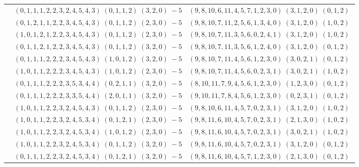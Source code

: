 \documentclass[11pt]{article}
\begin{document}
\begin{longtable}[l]{|c|c|c|}
 \cline{2-3} 
 & $(0 ,1 ,1 ,1 ,2 ,2 ,3 ,2 ,4 ,5 ,4 ,3) \;(0 ,1 ,1 ,2) \;(3 ,2 ,0) \;-5$ & $(9 ,8 ,10 ,6 ,11 ,4 ,5 ,7 ,1 ,2 ,3 ,0) \;(3 ,1 ,2 ,0) \;(0 ,1 ,2) \;$\\ 
 \cline{2-3} 
 & $(0 ,1 ,2 ,1 ,1 ,2 ,2 ,3 ,4 ,5 ,4 ,3) \;(0 ,1 ,1 ,2) \;(2 ,3 ,0) \;-5$ & $(9 ,8 ,10 ,7 ,11 ,2 ,5 ,6 ,1 ,3 ,4 ,0) \;(3 ,1 ,2 ,0) \;(1 ,0 ,2) \;$\\ 
 \cline{2-3} 
 & $(1 ,0 ,1 ,2 ,1 ,2 ,2 ,3 ,4 ,5 ,4 ,3) \;(0 ,1 ,1 ,2) \;(2 ,3 ,0) \;-5$ & $(9 ,8 ,10 ,7 ,11 ,3 ,5 ,6 ,0 ,2 ,4 ,1) \;(3 ,1 ,2 ,0) \;(1 ,0 ,2) \;$\\ 
 \cline{2-3} 
 & $(0 ,1 ,1 ,2 ,1 ,2 ,2 ,3 ,4 ,5 ,4 ,3) \;(0 ,1 ,1 ,2) \;(3 ,2 ,0) \;-5$ & $(9 ,8 ,10 ,7 ,11 ,3 ,5 ,6 ,1 ,2 ,4 ,0) \;(3 ,1 ,2 ,0) \;(0 ,1 ,2) \;$\\ 
 \cline{2-3} 
 & $(0 ,1 ,1 ,1 ,2 ,2 ,2 ,3 ,4 ,5 ,4 ,3) \;(1 ,0 ,1 ,2) \;(3 ,2 ,0) \;-5$ & $(9 ,8 ,10 ,7 ,11 ,4 ,5 ,6 ,1 ,2 ,3 ,0) \;(3 ,0 ,2 ,1) \;(0 ,1 ,2) \;$\\ 
 \cline{2-3} 
 & $(1 ,0 ,1 ,1 ,2 ,2 ,2 ,3 ,4 ,5 ,4 ,3) \;(1 ,0 ,1 ,2) \;(2 ,3 ,0) \;-5$ & $(9 ,8 ,10 ,7 ,11 ,4 ,5 ,6 ,0 ,2 ,3 ,1) \;(3 ,0 ,2 ,1) \;(1 ,0 ,2) \;$\\ 
 \cline{2-3} 
 & $(0 ,1 ,1 ,1 ,2 ,2 ,2 ,3 ,5 ,3 ,4 ,4) \;(0 ,2 ,1 ,1) \;(3 ,2 ,0) \;-5$ & $(8 ,10 ,11 ,7 ,9 ,4 ,5 ,6 ,1 ,2 ,3 ,0) \;(1 ,2 ,3 ,0) \;(0 ,1 ,2) \;$\\ 
 \cline{2-3} 
 & $(0 ,1 ,1 ,1 ,2 ,2 ,2 ,3 ,3 ,5 ,4 ,4) \;(2 ,0 ,1 ,1) \;(3 ,2 ,0) \;-5$ & $(9 ,10 ,11 ,7 ,8 ,4 ,5 ,6 ,1 ,2 ,3 ,0) \;(0 ,2 ,3 ,1) \;(0 ,1 ,2) \;$\\ 
 \cline{2-3} 
 & $(1 ,0 ,1 ,1 ,2 ,2 ,3 ,2 ,4 ,5 ,4 ,3) \;(0 ,1 ,1 ,2) \;(2 ,3 ,0) \;-5$ & $(9 ,8 ,10 ,6 ,11 ,4 ,5 ,7 ,0 ,2 ,3 ,1) \;(3 ,1 ,2 ,0) \;(1 ,0 ,2) \;$\\ 
 \cline{2-3} 
 & $(1 ,0 ,1 ,1 ,2 ,2 ,3 ,2 ,4 ,5 ,3 ,4) \;(0 ,1 ,2 ,1) \;(2 ,3 ,0) \;-5$ & $(9 ,8 ,11 ,6 ,10 ,4 ,5 ,7 ,0 ,2 ,3 ,1) \;(2 ,1 ,3 ,0) \;(1 ,0 ,2) \;$\\ 
 \cline{2-3} 
 & $(1 ,0 ,1 ,1 ,2 ,2 ,3 ,2 ,4 ,5 ,3 ,4) \;(1 ,0 ,1 ,2) \;(2 ,3 ,0) \;-5$ & $(9 ,8 ,11 ,6 ,10 ,4 ,5 ,7 ,0 ,2 ,3 ,1) \;(3 ,0 ,2 ,1) \;(1 ,0 ,2) \;$\\ 
 \cline{2-3} 
 & $(1 ,0 ,1 ,1 ,2 ,2 ,3 ,2 ,4 ,5 ,3 ,4) \;(0 ,1 ,1 ,2) \;(3 ,2 ,0) \;-5$ & $(9 ,8 ,11 ,6 ,10 ,4 ,5 ,7 ,0 ,2 ,3 ,1) \;(3 ,1 ,2 ,0) \;(0 ,1 ,2) \;$\\ 
 \cline{2-3} 
 & $(0 ,1 ,1 ,1 ,2 ,2 ,3 ,2 ,4 ,5 ,3 ,4) \;(0 ,1 ,2 ,1) \;(3 ,2 ,0) \;-5$ & $(9 ,8 ,11 ,6 ,10 ,4 ,5 ,7 ,1 ,2 ,3 ,0) \;(2 ,1 ,3 ,0) \;(0 ,1 ,2) \;$\\ 

\end{longtable}
\end{document}
